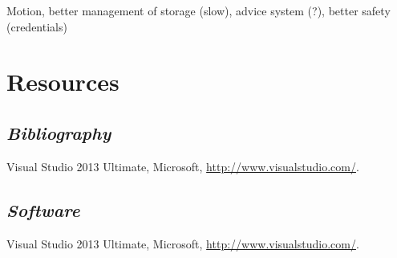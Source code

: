 \documentclass[12pt]{report}
\begin{document}
Motion, better management of storage (slow), advice system (?), better safety (credentials)
\newpage
\chapter{Resources}
\section{\it{Bibliography}}
\begin{description}
\item Visual Studio 2013 Ultimate, Microsoft, \url{http://www.visualstudio.com/}.
\end{description}
\section{\it{Software}}
\begin{description}
\item Visual Studio 2013 Ultimate, Microsoft, \url{http://www.visualstudio.com/}.
\end{description}

\newpage
\end{document}
